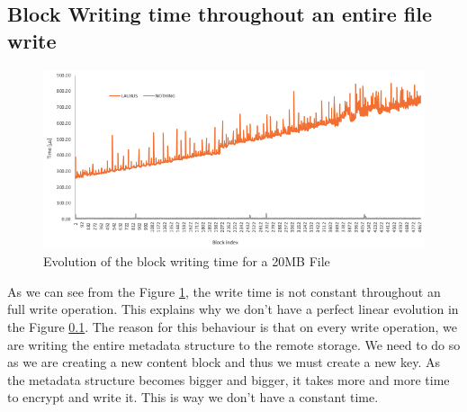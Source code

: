 \documentclass[../main.tex]{subfiles}
\begin{document}
\subsection{Block Writing time throughout an entire file write}
\begin{figure}[h]
    \centering
    \includegraphics[width=\textwidth]{images/appendix/perf_write_per_block_time}
    
    \caption{Evolution of the block writing time for a 20MB File}
    \label{appendix:figure:perf_time_per_block}
\end{figure}
\par As we can see from the Figure \ref{appendix:figure:perf_time_per_block}, the write time is not constant throughout an full write operation. This explains why we don't have a perfect linear evolution in the Figure \ref{}. The reason for this behaviour is that on every write operation, we are writing the entire metadata structure to the remote storage. We need to do so as we are creating a new content block and thus we must create a new key. As the metadata structure becomes bigger and bigger, it takes more and more time to encrypt and write it. This is way we don't have a constant time.
\end{document}
